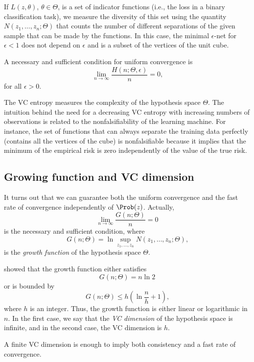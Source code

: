 If $L(z, \theta)$, $\theta \in \Theta$, is a set of indicator functions (i.e., the loss in a binary
classification task),  we measure the diversity of this set using the quantity $N(z_1,
\dots, z_n; \Theta)$ that counts the number of different separations of the given sample
that can be made by the functions.  In this case, the minimal $\epsilon$-net for $\epsilon < 1$
does not depend on $\epsilon$ and is a subset of the vertices of the unit cube.

A necessary and sufficient condition for uniform convergence is
\begin{equation}
  \label{eq:uniform-convergence}
  \lim_{n \to \infty} \frac{H(n; \Theta, \epsilon)}{n} = 0\text{,}
\end{equation}
for all $\epsilon > 0$.

The VC entropy measures the complexity of the hypothesis space $\Theta$.  The intuition
behind the need for a decreasing VC entropy with increasing numbers of observations is
related to the nonfalsifiability of the learning machine.  For instance, the set of
functions that can always separate the training data perfectly (contains all the vertices
of the cube) is nonfalsifiable because
it implies that the minimum of the empirical risk is zero independently of the value of
the true risk.

\subsection{Growing function and VC dimension}
\label{sub:vc-dimension}

It turns out that we can guarantee both the uniform convergence and the fast rate of
convergence independently of $\Prob(z)$.  Actually,
\[
  \lim_{n \to \infty} \frac{G(n; \Theta)}{n} = 0
\]
is the necessary and sufficient condition, where
\[
  G(n; \Theta) = \ln \sup_{z_1, \dots, z_n} N(z_1, \dots, z_n; \Theta)\text{,}
\]
is the \emph{growth function} of the hypothesis space $\Theta$.

\textcite{Vapnik1968} showed that the growth function either
satisfies
\[
  G(n; \Theta) = n \ln 2
\]
or is bounded by
\[
  G(n; \Theta) \leq h \left( \ln \frac{n}{h} + 1 \right)\text{,}
\]
where $h$ is an integer.  Thus, the growth function is either linear or logarithmic in
$n$.  In the first case, we say that the \emph{VC dimension} of the hypothesis space is
infinite, and in the second case, the VC dimension is $h$.

A finite VC dimension is enough to imply both consistency and a fast rate of convergence.

